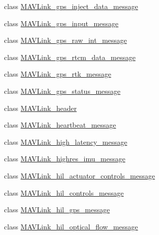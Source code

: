 \begin{DoxyCompactItemize}
\item 
class \hyperlink{classpymavlink_1_1dialects_1_1v10_1_1MAVLink__gps__inject__data__message}{M\+A\+V\+Link\+\_\+gps\+\_\+inject\+\_\+data\+\_\+message}
\item 
class \hyperlink{classpymavlink_1_1dialects_1_1v10_1_1MAVLink__gps__input__message}{M\+A\+V\+Link\+\_\+gps\+\_\+input\+\_\+message}
\item 
class \hyperlink{classpymavlink_1_1dialects_1_1v10_1_1MAVLink__gps__raw__int__message}{M\+A\+V\+Link\+\_\+gps\+\_\+raw\+\_\+int\+\_\+message}
\item 
class \hyperlink{classpymavlink_1_1dialects_1_1v10_1_1MAVLink__gps__rtcm__data__message}{M\+A\+V\+Link\+\_\+gps\+\_\+rtcm\+\_\+data\+\_\+message}
\item 
class \hyperlink{classpymavlink_1_1dialects_1_1v10_1_1MAVLink__gps__rtk__message}{M\+A\+V\+Link\+\_\+gps\+\_\+rtk\+\_\+message}
\item 
class \hyperlink{classpymavlink_1_1dialects_1_1v10_1_1MAVLink__gps__status__message}{M\+A\+V\+Link\+\_\+gps\+\_\+status\+\_\+message}
\item 
class \hyperlink{classpymavlink_1_1dialects_1_1v10_1_1MAVLink__header}{M\+A\+V\+Link\+\_\+header}
\item 
class \hyperlink{classpymavlink_1_1dialects_1_1v10_1_1MAVLink__heartbeat__message}{M\+A\+V\+Link\+\_\+heartbeat\+\_\+message}
\item 
class \hyperlink{classpymavlink_1_1dialects_1_1v10_1_1MAVLink__high__latency__message}{M\+A\+V\+Link\+\_\+high\+\_\+latency\+\_\+message}
\item 
class \hyperlink{classpymavlink_1_1dialects_1_1v10_1_1MAVLink__highres__imu__message}{M\+A\+V\+Link\+\_\+highres\+\_\+imu\+\_\+message}
\item 
class \hyperlink{classpymavlink_1_1dialects_1_1v10_1_1MAVLink__hil__actuator__controls__message}{M\+A\+V\+Link\+\_\+hil\+\_\+actuator\+\_\+controls\+\_\+message}
\item 
class \hyperlink{classpymavlink_1_1dialects_1_1v10_1_1MAVLink__hil__controls__message}{M\+A\+V\+Link\+\_\+hil\+\_\+controls\+\_\+message}
\item 
class \hyperlink{classpymavlink_1_1dialects_1_1v10_1_1MAVLink__hil__gps__message}{M\+A\+V\+Link\+\_\+hil\+\_\+gps\+\_\+message}
\item 
class \hyperlink{classpymavlink_1_1dialects_1_1v10_1_1MAVLink__hil__optical__flow__message}{M\+A\+V\+Link\+\_\+hil\+\_\+optical\+\_\+flow\+\_\+message}
\item 

\end{DoxyCompactItemize}
